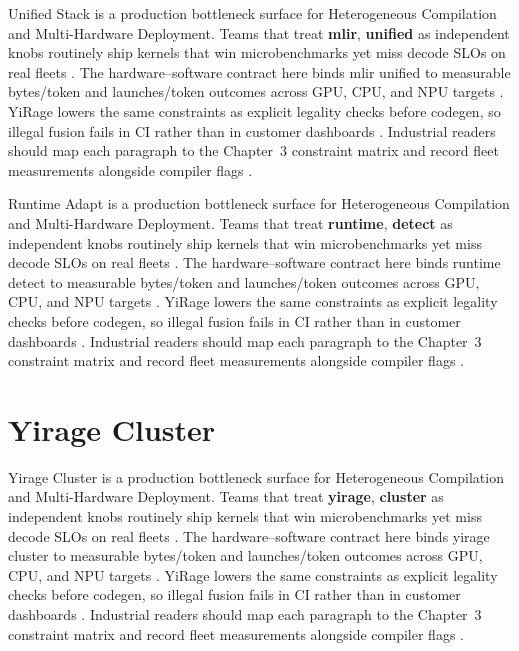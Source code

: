 Unified Stack is a production bottleneck surface for Heterogeneous Compilation and Multi-Hardware Deployment. Teams that treat \textbf{mlir}, \textbf{unified} as independent knobs routinely ship kernels that win microbenchmarks yet miss decode SLOs on real fleets \citep{nvidia2022hopper,amd2024aie}. The hardware--software contract here binds mlir unified to measurable bytes/token and launches/token outcomes across GPU, CPU, and NPU targets \citep{semianalysis2024tma,dlbook}. YiRage lowers the same constraints as explicit legality checks before codegen, so illegal fusion fails in CI rather than in customer dashboards \citep{amd2024xdna,dao2022flashattention}. Industrial readers should map each paragraph to the Chapter~3 constraint matrix and record fleet measurements alongside compiler flags \citep{amd2024aie,kwon2023vllm}.

Runtime Adapt is a production bottleneck surface for Heterogeneous Compilation and Multi-Hardware Deployment. Teams that treat \textbf{runtime}, \textbf{detect} as independent knobs routinely ship kernels that win microbenchmarks yet miss decode SLOs on real fleets \citep{semianalysis2024tma,dlbook}. The hardware--software contract here binds runtime detect to measurable bytes/token and launches/token outcomes across GPU, CPU, and NPU targets \citep{amd2024xdna,dao2022flashattention}. YiRage lowers the same constraints as explicit legality checks before codegen, so illegal fusion fails in CI rather than in customer dashboards \citep{amd2024aie,kwon2023vllm}. Industrial readers should map each paragraph to the Chapter~3 constraint matrix and record fleet measurements alongside compiler flags \citep{dlbook,nvidia2024cudagraphs}.

\section{Yirage Cluster}
\label{sec:yirage_cluster}

Yirage Cluster is a production bottleneck surface for Heterogeneous Compilation and Multi-Hardware Deployment. Teams that treat \textbf{yirage}, \textbf{cluster} as independent knobs routinely ship kernels that win microbenchmarks yet miss decode SLOs on real fleets \citep{amd2024xdna,dao2022flashattention}. The hardware--software contract here binds yirage cluster to measurable bytes/token and launches/token outcomes across GPU, CPU, and NPU targets \citep{amd2024aie,kwon2023vllm}. YiRage lowers the same constraints as explicit legality checks before codegen, so illegal fusion fails in CI rather than in customer dashboards \citep{dlbook,nvidia2024cudagraphs}. Industrial readers should map each paragraph to the Chapter~3 constraint matrix and record fleet measurements alongside compiler flags \citep{dao2022flashattention,liu2024deepseekv3}.

